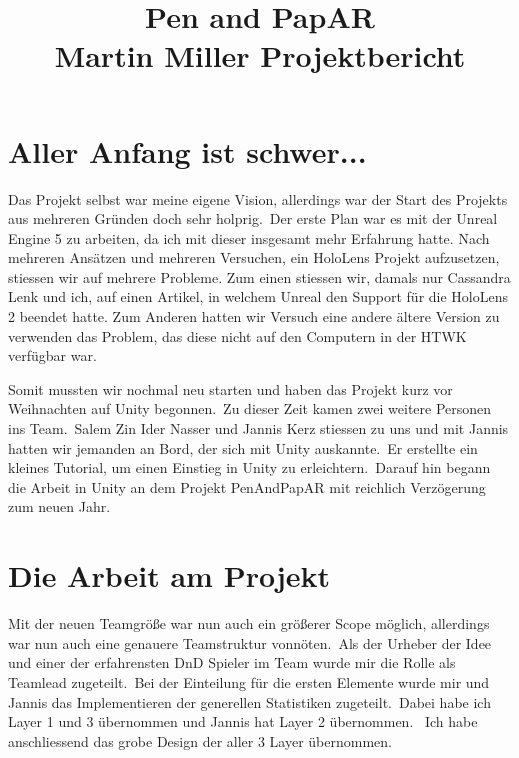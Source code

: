\documentclass[11pt]{article}
\begin{document}
    \title{Pen and PapAR \\ \large \textminus Martin Miller Projektbericht \textminus}

    \maketitle

    \section{Aller Anfang ist schwer...}\label{sec:chapter_beginning}
    Das Projekt selbst war meine eigene Vision, allerdings war der Start des Projekts aus mehreren Gründen doch sehr
    holprig.\ Der erste Plan war es mit der Unreal Engine 5 zu arbeiten, da ich mit dieser insgesamt mehr Erfahrung hatte.
    Nach mehreren Ansätzen und mehreren Versuchen, ein HoloLens Projekt aufzusetzen, stiessen wir auf mehrere Probleme.
    Zum einen stiessen wir, damals nur Cassandra Lenk und ich, auf einen Artikel, in welchem Unreal den Support für die
    HoloLens 2 beendet hatte.
    Zum Anderen hatten wir Versuch eine andere ältere Version zu verwenden das Problem, das diese nicht auf den Computern
    in der HTWK verfügbar war.

    Somit mussten wir nochmal neu starten und haben das Projekt kurz vor Weihnachten auf Unity begonnen.\ Zu dieser Zeit
    kamen zwei weitere Personen ins Team.\ Salem Zin Ider Nasser und Jannis Kerz stiessen zu uns und mit Jannis hatten
    wir jemanden an Bord, der sich mit Unity auskannte.\ Er erstellte ein kleines Tutorial, um einen Einstieg in Unity zu
    erleichtern.\ Darauf hin begann die Arbeit in Unity an dem Projekt PenAndPapAR mit reichlich Verzögerung zum neuen
    Jahr.
    
    \section{Die Arbeit am Projekt}\label{sec:chapter_working_on_penandpapar}
    Mit der neuen Teamgröße war nun auch ein größerer Scope möglich, allerdings war nun auch eine genauere Teamstruktur
    vonnöten.\ Als der Urheber der Idee und einer der erfahrensten DnD Spieler im Team wurde mir die Rolle als Teamlead
    zugeteilt.\ Bei der Einteilung für die ersten Elemente wurde mir und Jannis das Implementieren der generellen
    Statistiken zugeteilt.\ Dabei habe ich Layer 1 und 3 übernommen und Jannis hat Layer 2 übernommen. \ Ich habe
    anschliessend das grobe Design der aller 3 Layer übernommen.
\end{document}
